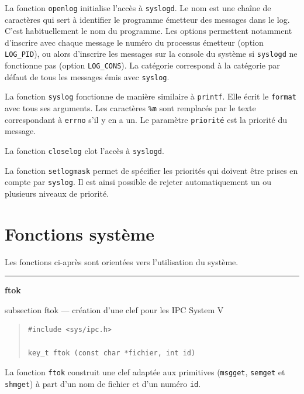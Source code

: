 \documentclass [twoside] {report}
\newcommand {\primitive} [1]
    {
	\phantomsection
	{\large \textbf {#1}}
	\addcontentsline {toc} {subsection} {#1}
    }
\newcommand {\separation}
    {
	\vspace {5mm}
	\nopagebreak
	\hrule
    }
\begin{document}
La fonction \texttt {openlog} initialise l'accès à \texttt {syslogd}. Le nom est
une chaîne de caractères qui sert à identifier le programme émetteur des
messages dans le log. C'est habituellement le nom du programme. Les
options permettent notamment d'inscrire avec chaque message le numéro du
processus émetteur (option \texttt {LOG\_PID}), ou alors d'inscrire les
messages sur la console du système si \texttt {syslogd} ne fonctionne pas
(option \texttt {LOG\_CONS}). La catégorie correspond à la catégorie par
défaut de tous les messages émis avec \texttt {syslog}.

La fonction \texttt {syslog} fonctionne de manière similaire à \texttt
{printf}.  Elle écrit le \texttt {format} avec tous ses arguments. Les
caractères \texttt {\%m} sont remplacés par le texte correspondant
à \texttt {errno} s'il y en a un.  Le paramètre \texttt {priorité}
est la priorité du message.

La fonction \texttt {closelog} clot l'accès à \texttt {syslogd}.

La fonction \texttt {setlogmask} permet de spécifier les priorités qui
doivent être prises en compte par \texttt {syslog}. Il est ainsi possible de
rejeter automatiquement un ou plusieurs niveaux de priorité.




\section {Fonctions système}



Les fonctions ci-après sont orientées vers l'utilisation du
système.



\separation 
\primitive {ftok} --- création d'une clef pour les IPC System V

\begin {quote}
\begin {verbatim}
#include <sys/ipc.h>

key_t ftok (const char *fichier, int id)
\end{verbatim}
\end {quote}

La fonction \texttt {ftok} construit une clef adaptée aux primitives
(\texttt {msgget}, \texttt {semget} et \texttt {shmget}) à part d'un
nom de fichier et d'un numéro \texttt {id}.
\end{document}
